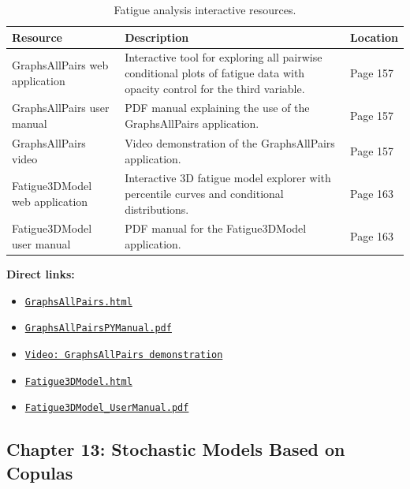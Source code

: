 \begin{table}[H]
\centering
\caption{Fatigue analysis interactive resources.}
\begin{tabular}{p{3.5cm}p{8cm}p{2.5cm}}
\toprule
\textbf{Resource} & \textbf{Description} & \textbf{Location} \\
\midrule
GraphsAllPairs web application & Interactive tool for exploring all pairwise conditional plots of fatigue data with opacity control for the third variable. & Page 157 \\
GraphsAllPairs user manual & PDF manual explaining the use of the GraphsAllPairs application. & Page 157 \\
GraphsAllPairs video & Video demonstration of the GraphsAllPairs application. & Page 157 \\
Fatigue3DModel web application & Interactive 3D fatigue model explorer with percentile curves and conditional distributions. & Page 163 \\
Fatigue3DModel user manual & PDF manual for the Fatigue3DModel application. & Page 163 \\
\bottomrule
\end{tabular}
\end{table}

\noindent
\textbf{Direct links:}
\begin{itemize}
    \item \href{https://enriquecastilloron.github.io/mi-libro-interactivo/apps/GraphsAllPairs.html}{\nolinkurl{GraphsAllPairs.html}}
    \item \href{https://raw.githubusercontent.com/EnriqueCastilloRon/mi-libro-interactivo/main/manuales/GraphsAllPairsPYManual.pdf}{\nolinkurl{GraphsAllPairsPYManual.pdf}}
    \item \href{https://youtu.be/0fQ34rgzQn8}{\nolinkurl{Video: GraphsAllPairs demonstration}}
    \item \href{https://enriquecastilloron.github.io/mi-libro-interactivo/apps/Fatigue3DModel.html}{\nolinkurl{Fatigue3DModel.html}}
    \item \href{https://raw.githubusercontent.com/EnriqueCastilloRon/mi-libro-interactivo/main/manuales/Fatigue3DModel_UserManual.pdf}{\nolinkurl{Fatigue3DModel_UserManual.pdf}}
\end{itemize}

\subsection{Chapter 13: Stochastic Models Based on Copulas}

